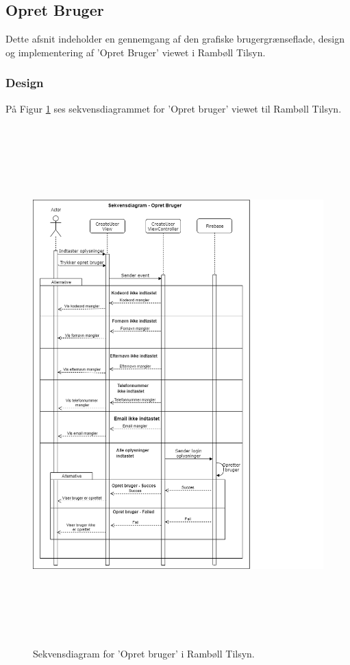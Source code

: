\subsection{Opret Bruger}\label{sec:Opretbruger}
Dette afsnit indeholder en gennemgang af den grafiske brugergrænseflade, design og implementering af 'Opret Bruger' viewet i Rambøll Tilsyn.

\subsubsection{Design}
På Figur \ref{fig:OpretBrugerSekvens} ses sekvensdiagrammet for 'Opret bruger' viewet til Rambøll Tilsyn.
\begin{figure}[H] %
	\centering
	\includegraphics[height=20cm, width=15cm]{../ArkitekturDesign/Design/OpretBruger/OpretBrugerSekvensDiagram}
	\caption{Sekvensdiagram for 'Opret bruger' i Rambøll Tilsyn.}
	\label{fig:OpretBrugerSekvens}
\end{figure}

